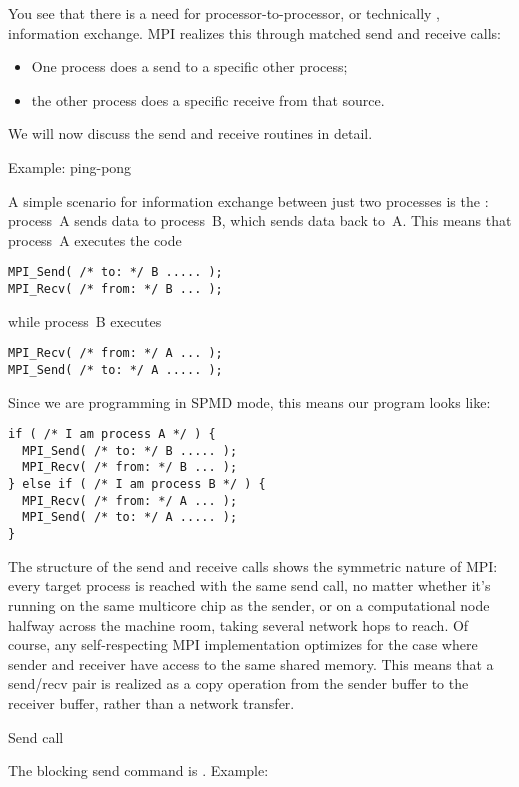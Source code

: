 You see that there is a need for processor-to-processor, or
technically , information exchange.
MPI realizes this through matched send and receive calls:
\begin{itemize}
\item One process does a send to a specific other process;
\item the other process does a specific receive from that source.
\end{itemize}

We will now discuss the send and receive routines in detail.

 {Example: ping-pong}
\label{sec:mpi-send-recv}

A simple scenario for information exchange between just two processes
is the : process~A sends data to process~B, which
sends data back to~A. This means that process~A executes the code
\begin{lstlisting}
MPI_Send( /* to: */ B ..... );
MPI_Recv( /* from: */ B ... );
\end{lstlisting}
while process~B executes
\begin{lstlisting}
MPI_Recv( /* from: */ A ... );
MPI_Send( /* to: */ A ..... );
\end{lstlisting}
Since we are programming in SPMD mode, this means our program looks like:
\begin{lstlisting}
if ( /* I am process A */ ) {
  MPI_Send( /* to: */ B ..... );
  MPI_Recv( /* from: */ B ... );
} else if ( /* I am process B */ ) {
  MPI_Recv( /* from: */ A ... );
  MPI_Send( /* to: */ A ..... );
}
\end{lstlisting}

\begin{remark}
  The structure of the send and receive calls shows the symmetric nature of MPI: every
  target process is reached with the same send call, no matter whether it's
  running on the same multicore chip as the sender, or on a
  computational node halfway across the machine room, taking
  several network hops to reach. Of course, any
  self-respecting MPI implementation optimizes for the case where sender
  and receiver have access to the same shared memory.
  This means that a send/recv pair is realized as
  a copy operation from the sender buffer to the
  receiver buffer, rather than a network transfer.
\end{remark}

 {Send call}

The blocking send command is
%
.
%
Example:

